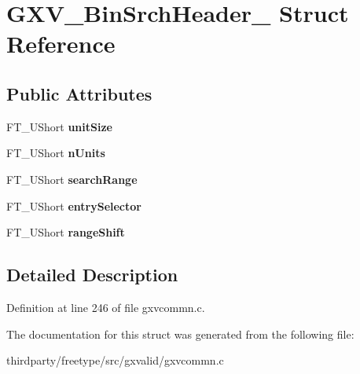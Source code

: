 \hypertarget{struct_g_x_v___bin_srch_header__}{}\section{G\+X\+V\+\_\+\+Bin\+Srch\+Header\+\_\+ Struct Reference}
\label{struct_g_x_v___bin_srch_header__}
\subsection*{Public Attributes}
\begin{DoxyCompactItemize}
\item 
\mbox{\label{struct_g_x_v___bin_srch_header___a84118c1112046d94ea426c3ecead8e00}} 
F\+T\+\_\+\+U\+Short {\bfseries unit\+Size}
\item 
\mbox{\label{struct_g_x_v___bin_srch_header___a6500cf229fd94fb87dac82ba35417738}} 
F\+T\+\_\+\+U\+Short {\bfseries n\+Units}
\item 
\mbox{\label{struct_g_x_v___bin_srch_header___a1c217b001da6ab39895e80ed7c73ebbc}} 
F\+T\+\_\+\+U\+Short {\bfseries search\+Range}
\item 
\mbox{\label{struct_g_x_v___bin_srch_header___aeeba5e1e9264696a085da636600bfff8}} 
F\+T\+\_\+\+U\+Short {\bfseries entry\+Selector}
\item 
\mbox{\label{struct_g_x_v___bin_srch_header___a357ee597ad5ba94d1cd0d6eefc963ea9}} 
F\+T\+\_\+\+U\+Short {\bfseries range\+Shift}
\end{DoxyCompactItemize}


\subsection{Detailed Description}


Definition at line 246 of file gxvcommn.\+c.



The documentation for this struct was generated from the following file\+:\begin{DoxyCompactItemize}
\item 
thirdparty/freetype/src/gxvalid/gxvcommn.\+c\end{DoxyCompactItemize}
